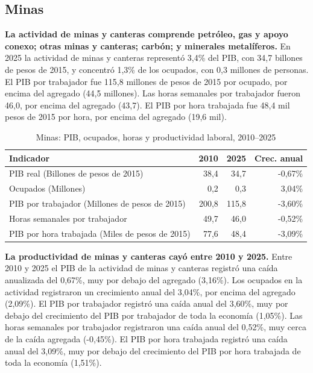 \subsection{Minas}

\textbf{La actividad de minas y canteras comprende petróleo, gas y apoyo conexo; otras minas y canteras; carbón; y minerales metalíferos.} En 2025 la actividad de minas y canteras representó 3,4\% del PIB, con 34,7 billones de pesos de 2015, y concentró 1,3\% de los ocupados, con 0,3 millones de personas. El PIB por trabajador fue 115,8 millones de pesos de 2015 por ocupado, por encima del agregado (44,5 millones). Las horas semanales por trabajador fueron 46,0, por encima del agregado (43,7). El PIB por hora trabajada fue 48,4 mil pesos de 2015 por hora, por encima del agregado (19,6 mil).

\begin{table}[H]
\centering
\caption{Minas: PIB, ocupados, horas y productividad laboral, 2010--2025}
\label{tab:sector_b_productividad}
\small
\begin{tabular}{lrrr}
\toprule
Indicador & 2010 & 2025 & Crec. anual \\
\midrule
PIB real  (Billones de pesos de 2015) & 38,4 & 34,7 & -0,67\% \\
Ocupados (Millones) & 0,2 & 0,3 & 3,04\% \\
PIB por trabajador (Millones de pesos de 2015) & 200,8 & 115,8 & -3,60\% \\
Horas semanales por trabajador & 49,7 & 46,0 & -0,52\% \\
PIB por hora trabajada (Miles de pesos de 2015) & 77,6 & 48,4 & -3,09\% \\
\bottomrule
\end{tabular}
\end{table}

\textbf{La productividad de minas y canteras cayó entre 2010 y 2025.} Entre 2010 y 2025 el PIB de la actividad de minas y canteras registró una caída anualizada del 0,67\%, muy por debajo del agregado (3,16\%). Los ocupados en la actividad registraron un crecimiento anual del 3,04\%, por encima del agregado (2,09\%). El PIB por trabajador registró una caída anual del 3,60\%, muy por debajo del crecimiento del PIB por trabajador de toda la economía (1,05\%). Las horas semanales por trabajador registraron una caída anual del 0,52\%, muy cerca de la caída agregada (-0,45\%). El PIB por hora trabajada registró una caída anual del 3,09\%, muy por debajo del crecimiento del PIB por hora trabajada de toda la economía (1,51\%).

